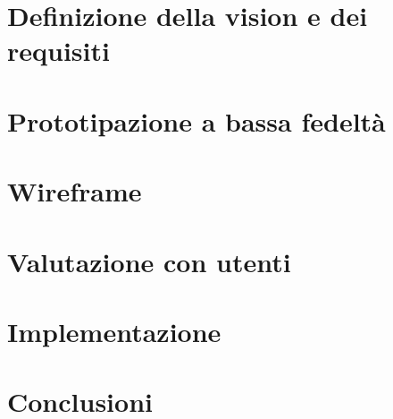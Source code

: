 \documentclass[11pt, a4paper]{report}
\begin{document}
    \chapter{Definizione della vision e dei requisiti}
    

    \chapter{Prototipazione a bassa fedeltà}
    

    \chapter{Wireframe}
    \label{ch:wireframe}
    

    \chapter{Valutazione con utenti}
    

    \chapter{Implementazione}
    

    \chapter{Conclusioni}
    
\end{document}
